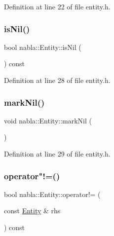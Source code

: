 Definition at line 22 of file entity.\+h.

\mbox{\label{structnabla_1_1_entity_ab121ebf82b7a9a60de85b4683454569f}} 
\subsubsection{\texorpdfstring{isNil()}{isNil()}}
{\footnotesize\ttfamily bool nabla\+::\+Entity\+::is\+Nil (\begin{DoxyParamCaption}{ }\end{DoxyParamCaption}) const\hspace{0.3cm}{\ttfamily [inline]}}



Definition at line 28 of file entity.\+h.

\mbox{\label{structnabla_1_1_entity_a089ff4e9a1f34c51bc9d472f2a47f33d}} 
\subsubsection{\texorpdfstring{markNil()}{markNil()}}
{\footnotesize\ttfamily void nabla\+::\+Entity\+::mark\+Nil (\begin{DoxyParamCaption}{ }\end{DoxyParamCaption})\hspace{0.3cm}{\ttfamily [inline]}}



Definition at line 29 of file entity.\+h.

\mbox{\label{structnabla_1_1_entity_a4d68a63047a53435df7345276f397dda}} 
\subsubsection{\texorpdfstring{operator"!=()}{operator!=()}}
{\footnotesize\ttfamily bool nabla\+::\+Entity\+::operator!= (\begin{DoxyParamCaption}\item[{const \mbox{\hyperlink{structnabla_1_1_entity}{Entity}} \&}]{rhs }\end{DoxyParamCaption}) const\hspace{0.3cm}{\ttfamily [inline]}}



